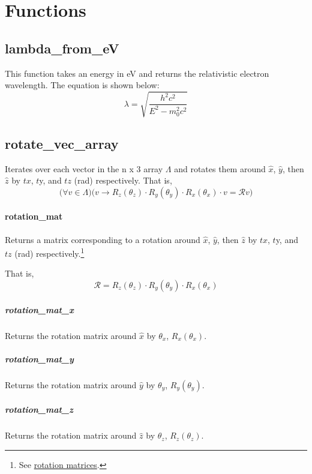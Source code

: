\documentclass{article}
\begin{document}
	\maketitle
	\tableofcontents
	\newpage
	\section{Functions}
		\subsection{lambda\_from\_eV}
			This function takes an energy in eV and returns the 	relativistic electron wavelength. The equation is shown below:
			\begin{equation}
				\lambda = \sqrt{\frac{h^2c^2}{E^2-m_0^2 c^2}}
			\end{equation}
	
		\subsection{rotate\_vec\_array}
			Iterates over each vector in the n x 3 array $\Lambda$ and rotates them around $\hat{x}$, $\hat{y}$, then $\hat{z}$ by $tx$, $t$y, and $tz$ (rad) respectively.
			That is, 
			\begin{equation}
				\Bigg(\forall v\in \Lambda\Bigg)\Bigg(v\to R_z(\theta_z)\cdot R_y(\theta_y)\cdot R_x(\theta_x) \cdot v = \mathcal{R}v\Bigg)
			\end{equation}
	
		\paragraph{rotation\_mat}
			Returns a matrix corresponding to a rotation around $\hat{x}$, $\hat{y}$, then $\hat{z}$ by $tx$, $t$y, and $tz$ (rad) respectively.\footnote{See  \href{https://en.wikipedia.org/wiki/Rotation\_matrix}{rotation matrices}.}
				
			That is,
				\begin{equation}
					\mathcal{R}=R_z(\theta_z)\cdot R_y(\theta_y)\cdot R_x(\theta_x)
				\end{equation}
			
			\subparagraph{rotation\_mat\_x}
				Returns the rotation matrix around $\hat{x}$ by $\theta_x$, $R_x(\theta_x)$.
				
			\subparagraph{rotation\_mat\_y}
				Returns the rotation matrix around $\hat{y}$ by $\theta_y$, $R_y(\theta_y)$.
			
			\subparagraph{rotation\_mat\_z}
				Returns the rotation matrix around $\hat{z}$ by $\theta_z$, $R_z(\theta_z)$.
\end{document}
